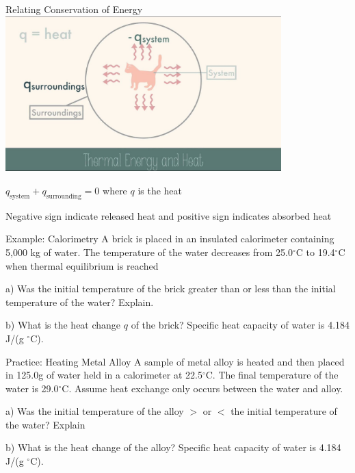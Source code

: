 \documentclass[11pt]{beamer}
\begin{document}
\begin{frame}{Relating Conservation of Energy}
  \centering
  \includegraphics[width=0.8\textwidth]{heat_sys}

  $q_\text{system} + q_\text{surrounding} = 0$
  where $q$ is the heat

  Negative sign indicate released heat and positive sign indicates
  absorbed heat
\end{frame}

\begin{frame}{Example: Calorimetry}
  A brick is placed in an insulated calorimeter containing 5,000 kg of
  water. The temperature of the water decreases from 25.0$^\circ$C to
  19.4$^\circ$C when thermal equilibrium is reached

  a) Was the initial temperature of the brick greater than or less than
  the initial temperature of the water? Explain.

  b) What is the heat change $q$ of the brick? Specific heat capacity
  of water is 4.184 J/(g $^\circ$C).

  \vfill
\end{frame}

\begin{frame}{Practice: Heating Metal Alloy}
  A sample of metal alloy is heated and then placed in 125.0g of water
  held in a calorimeter at 22.5$^\circ$C. The final temperature of the water
  is 29.0$^\circ$C. Assume heat exchange only occurs between the water and alloy.

  a) Was the initial temperature of the alloy $>$ or $<$ the initial
  temperature of the water? Explain

  b) What is the heat change of the alloy? Specific heat capacity
  of water is 4.184 J/(g $^\circ$C).

  \vfill
\end{frame}
\end{document}
